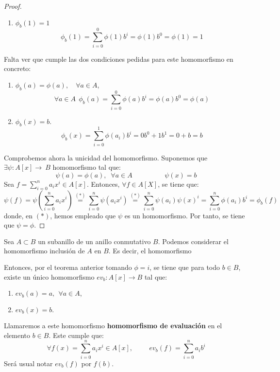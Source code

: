 \begin{proof}
\begin{enumerate}
        \item $\phi_b(1)=1$
        $$\phi_b(1) = \sum_{i=0}^0 \phi(1) b^i = \phi(1) b^0 = \phi(1) = 1$$
    \end{enumerate}
    
    Falta ver que cumple las dos condiciones pedidas para este homomorfismo en concreto:
    \begin{enumerate}
        \item $\phi_b(a) = \phi(a), \quad \forall a\in A$,
        $$\forall a \in A~~\phi_b(a) = \sum_{i=0}^0 \phi(a) b^i = \phi(a) b^0 = \phi(a)$$
        \item $\phi_b(x) = b$.
        $$\phi_b(x) = \sum_{i=0}^1 \phi(a_i) b^i = 0 b^0 + 1 b^1 = 0 + b = b$$
    \end{enumerate}
    
    Comprobemos ahora la unicidad del homomorfismo. Suponemos que $\exists \psi:A[x]\longrightarrow~B$ homomorfismo tal que:
    $$\psi(a) = \phi(a), \;\; \forall a \in A
    \hspace{2cm}
    \psi(x) = b
    $$
    Sea $f=\sum\limits_{i=0}^n a_ix^i \in A[x]$. Entonces, $\forall f\in A[X]$, se tiene que:
    \begin{equation*}
        \psi(f) = \psi\left( \sum_{i=0}^n a_i x^i \right) \stackrel{(\ast)}{=} \sum_{i=0}^n \psi(a_i x^i) \stackrel{(\ast)}{=} \sum_{i=0}^n \psi(a_i)\psi(x)^i =\sum_{i=0}^n \phi(a_i) b^i = \phi_b(f)
    \end{equation*}
    donde, en $(\ast)$, hemos empleado que $\psi$ es un homomorfismo. Por tanto, se tiene que $\psi = \phi$.
\end{proof}

\begin{definicion}
    Sea $A\subset B$ un subanillo de un anillo conmutativo $B$. Podemos considerar el homomorfismo inclusión de $A$ en $B$. Es decir, el homomorfismo
    
    Entonces, por el teorema anterior tomando $\phi=i$, se tiene que para todo $b \in B$, existe un único homomorfismo $ev_b:A[x]\longrightarrow B$ tal que:
    \begin{enumerate}
        \item $ev_b(a) = a,~~\forall a \in A$,
        \item $ev_b(x) = b$.
    \end{enumerate}
    
    Llamaremos a este homomorfismo \textbf{homomorfismo de evaluación} en el elemento $b \in B$. Este cumple que:
    $$\forall f(x) = \sum_{i=0}^n a_ix^i \in A[x], \hspace{1cm} ev_b(f) = \sum_{i=0}^n a_i b^i$$
    Será usual notar $ev_b(f)$ por $f(b)$.
\end{definicion}

